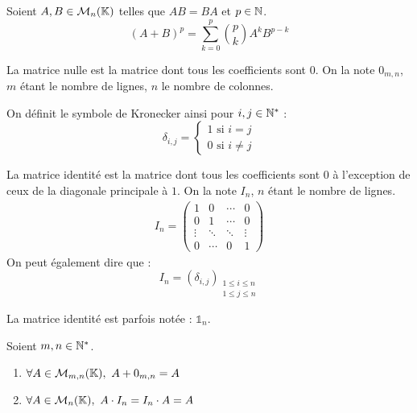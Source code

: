 \begin{proposition}
	Soient $A, B \in \mathcal{M}_n(\mathbb{K})$ telles que $AB = BA$ et $p \in \mathbb{N}$.
	\[ (A + B)^p = \sum_{k = 0}^{p} \binom{p}{k} A^k B^{p-k} \]
\end{proposition}

\begin{definition}
	La matrice nulle est la matrice dont tous les coefficients sont $0$. On la note $0_{m,n}$, $m$ étant le nombre de lignes, $n$ le nombre de colonnes. 
\end{definition}

\begin{definition}
	On définit le symbole de Kronecker ainsi pour $i, j \in \mathbb{N}^*$ :
	\[ \delta_{i,j} = 
	\begin{cases}
		1 \text{ si } i = j \\
		0 \text{ si } i \neq j
	\end{cases}
	\]
\end{definition}

\begin{definition}
	La matrice identité est la matrice dont tous les coefficients sont $0$ à l'exception de ceux de la diagonale principale à $1$. On la note $I_n$, $n$ étant le nombre de lignes.
	\begin{align*}
		I_n = 
		\begin{pmatrix}
			1 & 0 & \cdots & 0 \\
			0 & 1 & \cdots & 0 \\
			\vdots & \ddots & \ddots & \vdots \\
			0 & \cdots & 0 & 1
		\end{pmatrix}
	\end{align*}
	On peut également dire que :
	\[ I_n = (\delta_{i,j})_{\substack{1 \leq i \leq n \\ 1 \leq j \leq n}} \]
\end{definition}

\begin{remark}
    La matrice identité est parfois notée : $\mathds{1}_n$.
\end{remark}

\begin{lemma}
	Soient $m,n \in \mathbb{N}^*$.
	\begin{multicols}{2}
	    \begin{enumerate}
    		\item $\forall A \in \mathcal{M}_{m, n}(\K),\ A + 0_{m,n} = A$
    		\item $\forall A \in \mathcal{M}_{n}(\mathbb{K}),\ A \cdot I_n = I_n \cdot A = A$
    	\end{enumerate}
	\end{multicols}
\end{lemma}

